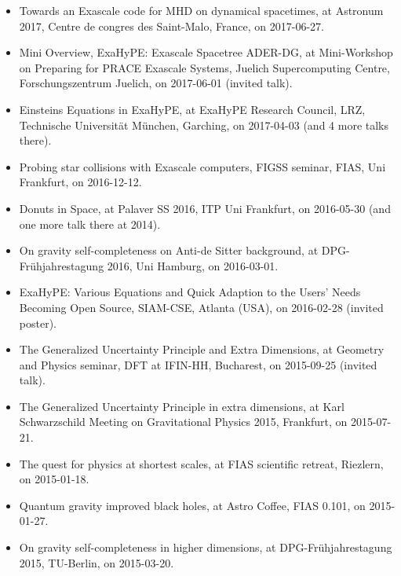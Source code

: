 \begin{fullwidth}
\begin{multicols}{2}
\begin{itemize}
	\item Towards an Exascale code for MHD on dynamical spacetimes, at Astronum 
	2017, Centre de congres des Saint-Malo, France, on 2017-06-27.
	
	\item Mini Overview, ExaHyPE: Exascale Spacetree ADER-DG, at Mini-Workshop 
	on Preparing for PRACE Exascale Systems, Juelich Supercomputing Centre, 
	Forschungszentrum Juelich, on 2017-06-01 (invited talk).
	
	\item Einsteins Equations in ExaHyPE, at ExaHyPE Research Council, LRZ, 
      Technische Universität M\"unchen, Garching, on 2017-04-03  
      (and 4 more talks there).
	
	\item Probing star collisions with Exascale computers, FIGSS seminar,
	  FIAS, Uni Frankfurt, on 2016-12-12.
	
	\item Donuts in Space, at Palaver SS 2016, ITP Uni Frankfurt, on 2016-05-30
	  (and one more talk there at 2014).
	
	\item On gravity self-completeness on Anti-de Sitter background, at 
	DPG-Frühjahrestagung 2016, Uni Hamburg, on 2016-03-01.
	
	\item ExaHyPE: Various Equations and Quick Adaption to the Users' Needs
	Becoming Open Source, SIAM-CSE, Atlanta (USA), on 2016-02-28
	(invited poster).
	
	\item The Generalized Uncertainty Principle and Extra Dimensions, at 
	Geometry and Physics seminar, DFT at IFIN-HH, Bucharest, on 2015-09-25 
	(invited talk).
	
	\item The Generalized Uncertainty Principle in extra dimensions, at Karl 
	Schwarzschild Meeting on Gravitational Physics 2015, Frankfurt, on 
	2015-07-21.

	\item The quest for physics at shortest scales, at FIAS scientific retreat, 
	Riezlern, on 2015-01-18.
	
	\item Quantum gravity improved black holes, at Astro Coffee, FIAS 0.101, on 
	2015-01-27.
	
	\item On gravity self-completeness in higher dimensions, at 
	DPG-Frühjahrestagung 2015, TU-Berlin, on 2015-03-20.
	

\end{itemize}
\end{multicols}
\end{fullwidth}
